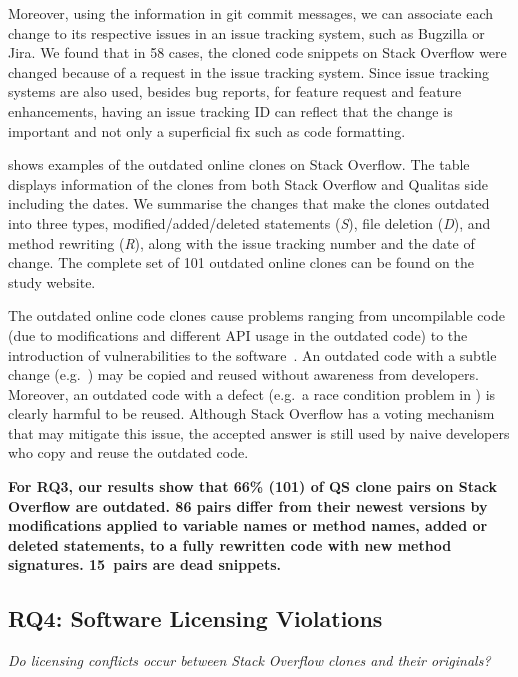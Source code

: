 \documentclass[10pt,journal,compsoc]{IEEEtran}
\begin{document}
Moreover, using the information in git commit messages, we can associate each
change to its respective issues in an issue tracking system, such as Bugzilla or
Jira. We found that in 58 cases, the cloned code snippets on Stack Overflow were
changed because of a request in the issue tracking system. Since issue tracking
systems are also used, besides bug reports, for feature request and feature
enhancements, having an issue tracking ID can reflect that the change is important
and not only a superficial fix such as code formatting.

 shows examples of the outdated online clones on
Stack Overflow. The table displays information of the clones from both Stack
Overflow and Qualitas side including the dates. We summarise the changes that
make the clones outdated into three types, modified/added/deleted statements
(\textit{S}), file deletion (\textit{D}), and method rewriting (\textit{R}),
along with the issue tracking number and the date of change. The complete set of
101 outdated online clones can be found on the study website.

The outdated online code clones cause problems ranging from uncompilable code
(due to modifications and different API usage in the outdated code) to
the introduction of vulnerabilities to the software~\cite{Xia2014}. An outdated code with a
subtle change (e.g.\ ) may be copied and reused without
awareness from developers. Moreover, an outdated code with a defect (e.g.\ a race
condition problem in ) is clearly harmful to be reused.
Although Stack Overflow has a voting mechanism that may mitigate this issue, the
accepted answer is still used by naive developers who copy and reuse the
outdated code.

\textbf{For RQ3, our results show that 66\% (101) of QS clone pairs on Stack
	Overflow are outdated. 86 pairs differ from their newest versions by
	modifications applied to variable names or method names, added or deleted
	statements, to a fully rewritten code with new method signatures. 15~pairs are
	dead snippets.}

\subsection{RQ4: Software Licensing Violations}
\vspace{0.25cm}
\textit{Do
	licensing conflicts occur between Stack Overflow clones and their
	originals?}
\vspace{0.25cm}
\end{document}
